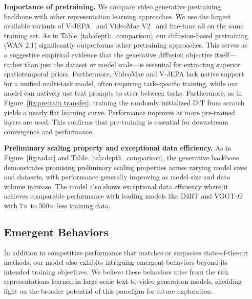 \documentclass[11pt, a4paper, logo, onecolumn]{googledeepmind}
\begin{document}
\noindent\textbf{Importance of pretraining.}
We compare video generative pretraining backbone with other representation learning approaches. 
We use the largest available variants of V-JEPA~\cite{bardes2024revisiting} and VideoMae V2~\cite{tong2022videomae} and fine-tune all on the same training set.
As in Table~\ref{tab:depth_comparison}, our diffusion-based pretraining (WAN 2.1) significantly outperforms other pretraining approaches. 
This serves as a suggestive empirical evidence that the generative diffusion objective itself—rather than just the dataset or model scale—is essential for extracting superior spatiotemporal priors.
Furthermore, VideoMae and V-JEPA lack native support for a unified multi-task model, often requiring task-specific training, while our model can natively use text prompts to steer between tasks.
Furthermore, as in Figure~\ref{fig:pretrain transfer}, training the randomly initialized DiT from scratch yields a nearly flat learning curve. Performance improves as more pre-trained layers are used. This confirms that pre-training is essential for downstream convergence and performance.

\noindent\textbf{Preliminary scaling property and exceptional data efficiency.}
As in Figure~\ref{fig:radar} and Table~\ref{tab:depth_comparison}, the generative backbone demonstrates promising preliminary scaling properties across varying model sizes and datasets, with performance generally improving as model size and data volume increase. The model also shows exceptional data efficiency where it achieves comparable performance with leading models like D4RT and VGGT-$\Omega$ with 7$\times$ to 500$\times$ less training data.


\subsection{Emergent Behaviors}
In addition to competitive performance that matches or surpasses state-of-the-art methods, our model also exhibits intriguing emergent behaviors beyond its intended training objectives. We believe these behaviors arise from the rich 
representations learned in large-scale text-to-video generation models, shedding light on the broader potential of this paradigm for future exploration.
\end{document}
